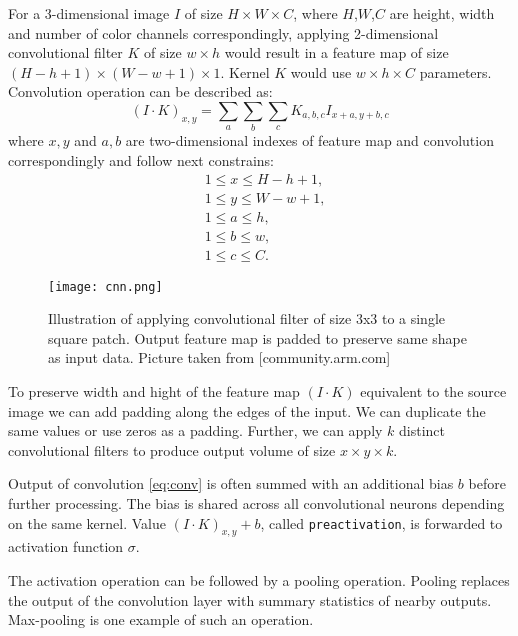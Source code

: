 For a 3-dimensional image $I$ of size $H \times W \times C$, where $H$,$W$,$C$ are height, width and number of color channels correspondingly, applying 2-dimensional convolutional filter $K$ of size $w \times h$ would result in a feature map of size $(H-h+1) \times (W-w+1) \times 1$. Kernel $K$ would use $w \times h \times C$ parameters. Convolution operation can be described as:
\begin{equation}\label{eq:conv}
  (I \cdot K)_{x, y} = \sum_a \sum_b \sum_c K_{a,b,c} I_{x+a, y+b,c}
\end{equation}
where ${x, y}$ and ${a,b}$ are two-dimensional indexes of feature map and convolution correspondingly and follow next constrains:
\begin{equation*}
  \begin{aligned}
  &1 \leq  x \leq H-h+1, \\
  &1 \leq  y \leq W-w+1, \\
  &1 \leq  a \leq h, \\
  &1 \leq  b \leq w, \\
  &1 \leq  c \leq C.
\end{aligned}
\end{equation*}

\begin{figure}
  \texttt{[image: cnn.png]}
  \caption{Illustration of applying convolutional filter of size 3x3 to a single square patch. Output feature map is padded to preserve same shape as input data. Picture taken from [community.arm.com]}
  \label{fig:cnn}
\end{figure}

To preserve width and hight of the feature map $(I \cdot K)$ equivalent to the source image we can add padding along the edges of the input. We can duplicate the same values or use zeros as a padding.
Further, we can apply $k$ distinct convolutional filters to produce output volume of size $x \times y \times k$.

Output of convolution \ref{eq:conv} is often summed with an additional bias $b$ before further processing.
The bias is shared across all convolutional neurons depending on the same kernel.
Value $(I \cdot K)_{x, y}+b$, called \texttt{preactivation}, is forwarded to activation function $\sigma$.

The activation operation can be followed by a pooling operation.
Pooling replaces the output of the convolution layer with summary statistics of nearby outputs.
Max-pooling is one example of such an operation.

